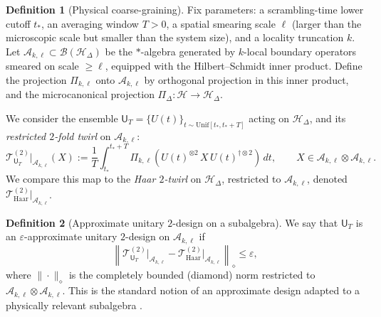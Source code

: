 \documentclass[a4paper,11pt]{article}
\theoremstyle{plain}
\theoremstyle{definition}
\newtheorem{definition}{Definition}
\theoremstyle{remark}
\begin{document}
\begin{definition}[Physical coarse-graining]\label{def:CG}
Fix parameters: a scrambling-time lower cutoff $t_\ast$, an averaging window $T>0$, a spatial smearing scale $\ell$ (larger than the microscopic scale but smaller than the system size), and a locality truncation $k$.  Let $\mathscr{A}_{k,\ell}\subset \mathcal{B}(\mathcal{H}_\Delta)$ be the $*$-algebra generated by $k$-local boundary operators smeared on scale $\ge \ell$, equipped with the Hilbert--Schmidt inner product.  Define the projection $\Pi_{k,\ell}$ onto $\mathscr{A}_{k,\ell}$ by orthogonal projection in this inner product, and the microcanonical projection $\Pi_\Delta:\mathcal{H}\to\mathcal{H}_\Delta$.

We consider the ensemble $\mathsf{U}_{T}=\{U(t)\}_{t\sim \mathrm{Unif}[t_\ast,t_\ast+T]}$ acting on $\mathcal{H}_\Delta$, and its {\em restricted $2$-fold twirl} on $\mathscr{A}_{k,\ell}$:
\begin{equation}
  \mathcal{T}^{(2)}_{\mathsf{U}_T}\big|_{\mathscr{A}_{k,\ell}}(X)
  := \frac{1}{T}\int_{t_\ast}^{t_\ast+T}
   \Pi_{k,\ell}\!\left(U(t)^{\otimes 2}\, X \, U(t)^{\dagger\otimes 2}\right)\,dt,
  \qquad X\in \mathscr{A}_{k,\ell}\otimes \mathscr{A}_{k,\ell}.
\end{equation}
We compare this map to the {\em Haar $2$-twirl} on $\mathcal{H}_\Delta$, restricted to $\mathscr{A}_{k,\ell}$, denoted $\mathcal{T}^{(2)}_{\mathrm{Haar}}\big|_{\mathscr{A}_{k,\ell}}$.
\end{definition}

\begin{definition}[Approximate unitary $2$-design on a subalgebra]
We say that $\mathsf{U}_{T}$ is an $\varepsilon$-approximate unitary $2$-design on $\mathscr{A}_{k,\ell}$ if
\begin{equation}
 \left\| \mathcal{T}^{(2)}_{\mathsf{U}_T}\big|_{\mathscr{A}_{k,\ell}} - \mathcal{T}^{(2)}_{\mathrm{Haar}}\big|_{\mathscr{A}_{k,\ell}} \right\|_{\diamond} \le \varepsilon,
\end{equation}
where $\|\cdot\|_\diamond$ is the completely bounded (diamond) norm restricted to $\mathscr{A}_{k,\ell}\otimes\mathscr{A}_{k,\ell}$.  This is the standard notion of an approximate design adapted to a physically relevant subalgebra \cite{BrandaoHarrowHorodecki2016,RobertsYoshida2017}.
\end{definition}
\end{document}
